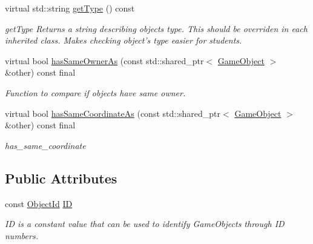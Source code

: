 \begin{DoxyCompactItemize}
virtual std\-::string \hyperlink{classCourse_1_1GameObject_aeecb0b8f5ed8d7b379e0e38ef4ebba10}{get\-Type} () const 
\begin{DoxyCompactList}\small\item\em get\-Type Returns a string describing objects type. This should be overriden in each inherited class. Makes checking object's type easier for students. \end{DoxyCompactList}\item 
virtual bool \hyperlink{classCourse_1_1GameObject_a1c592d7013f54f62be5eb6a99fcdfd64}{has\-Same\-Owner\-As} (const std\-::shared\-\_\-ptr$<$ \hyperlink{classCourse_1_1GameObject}{Game\-Object} $>$ \&other) const final
\begin{DoxyCompactList}\small\item\em Function to compare if objects have same owner. \end{DoxyCompactList}\item 
virtual bool \hyperlink{classCourse_1_1GameObject_a8d6a0a93150e7e4ca90176c028a037e1}{has\-Same\-Coordinate\-As} (const std\-::shared\-\_\-ptr$<$ \hyperlink{classCourse_1_1GameObject}{Game\-Object} $>$ \&other) const final
\begin{DoxyCompactList}\small\item\em has\-\_\-same\-\_\-coordinate \end{DoxyCompactList}\end{DoxyCompactItemize}
\subsection*{Public Attributes}
\begin{DoxyCompactItemize}
\item 
const \hyperlink{namespaceCourse_a9a16e743c9813da00109e4991afd2f3e}{Object\-Id} \hyperlink{classCourse_1_1GameObject_a6524f318100ebbaa1571996a2cab18a8}{I\-D}
\begin{DoxyCompactList}\small\item\em I\-D is a constant value that can be used to identify Game\-Objects through I\-D numbers. \end{DoxyCompactList}\end{DoxyCompactItemize}
